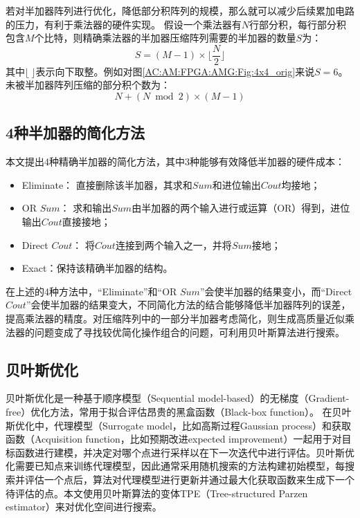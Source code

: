 若对半加器阵列进行优化，降低部分积阵列的规模，那么就可以减少后续累加电路的压力，有利于乘法器的硬件实现。
假设一个乘法器有$N$行部分积，每行部分积包含$M$个比特，则精确乘法器的半加器压缩阵列需要的半加器的数量$S$为：
\begin{equation}
    \label{AC:AM:FPGA:AMG:Eq:HA_number}
    S = (M-1) \times \lfloor \frac{N}{2} \rfloor
\end{equation}
其中$\lfloor \ \rfloor$表示向下取整。例如对图\ref{AC:AM:FPGA:AMG:Fig:4x4_orig}来说$S=6$。未被半加器阵列压缩的部分积个数为：
\begin{equation}
    \label{AC:AM:FPGA:AMG:Eq:Uncompress_number}
    N + (N \bmod 2) \times (M-1)
\end{equation}

\subsection{4种半加器的简化方法}

本文提出4种精确半加器的简化方法，其中3种能够有效降低半加器的硬件成本：
\begin{itemize}
    \item Eliminate： 直接删除该半加器，其求和$Sum$和进位输出$Cout$均接地；
    \item OR $Sum$： 求和输出$Sum$由半加器的两个输入进行或运算（OR）得到，进位输出$Cout$直接接地；
    \item Direct $Cout$： 将$Cout$连接到两个输入之一，并将$Sum$接地；
    \item Exact：保持该精确半加器的结构。
\end{itemize}

在上述的4种方法中，“Eliminate”和“OR $Sum$”会使半加器的结果变小，而“Direct $Cout$”会使半加器的结果变大，不同简化方法的结合能够降低半加器阵列的误差，提高乘法器的精度。对压缩阵列中的一部分半加器考虑简化，则生成高质量近似乘法器的问题变成了寻找较优简化操作组合的问题，可利用贝叶斯算法进行搜索。

\subsection{贝叶斯优化}

贝叶斯优化\cite{BBO:BayesianNeuralIPS}是一种基于顺序模型（Sequential model-based）的无梯度（Gradient-free）优化方法，常用于拟合评估昂贵的黑盒函数（Black-box function）。
在贝叶斯优化中，代理模型（Surrogate model，比如高斯过程Gaussian process）和获取函数（Acquisition function，比如预期改进expected improvement）一起用于对目标函数进行建模，并决定对哪个点进行采样以在下一次迭代中进行评估。贝叶斯优化需要已知点来训练代理模型，因此通常采用随机搜索的方法构建初始模型，每搜索并评估一个点后，算法对代理模型进行更新并通过最大化获取函数来生成下一个待评估的点。本文使用贝叶斯算法的变体TPE（Tree-structured Parzen estimator）\cite{BBO:TPE}来对优化空间进行搜索。

